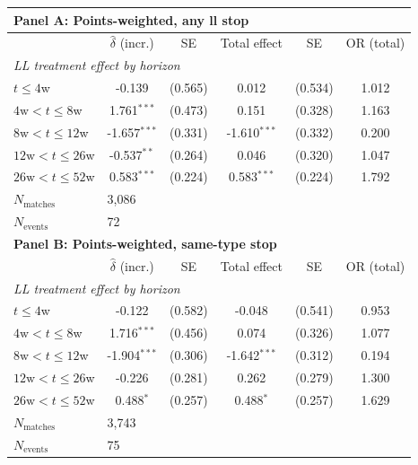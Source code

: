 \begin{tabular}{lccccc}
\toprule
\multicolumn{6}{l}{\textbf{Panel A: Points-weighted, any ll stop}} \\
\midrule
 & $\hat{\delta}$ (incr.) & SE & Total effect & SE & OR (total) \\
\midrule
\multicolumn{6}{l}{\textit{LL treatment effect by horizon}} \\
$t \leq 4$w & -0.139 & (0.565) & 0.012 & (0.534) & 1.012 \\
$4\text{w} < t \leq 8$w & 1.761$^{***}$ & (0.473) & 0.151 & (0.328) & 1.163 \\
$8\text{w} < t \leq 12$w & -1.657$^{***}$ & (0.331) & -1.610$^{***}$ & (0.332) & 0.200 \\
$12\text{w} < t \leq 26$w & -0.537$^{**}$ & (0.264) & 0.046 & (0.320) & 1.047 \\
$26\text{w} < t \leq 52$w & 0.583$^{***}$ & (0.224) & 0.583$^{***}$ & (0.224) & 1.792 \\
[4pt]
$N_{\text{matches}}$ & \multicolumn{5}{l}{3,086} \\
$N_{\text{events}}$ & \multicolumn{5}{l}{72} \\
\midrule
\multicolumn{6}{l}{\textbf{Panel B: Points-weighted, same-type stop}} \\
\midrule
 & $\hat{\delta}$ (incr.) & SE & Total effect & SE & OR (total) \\
\midrule
\multicolumn{6}{l}{\textit{LL treatment effect by horizon}} \\
$t \leq 4$w & -0.122 & (0.582) & -0.048 & (0.541) & 0.953 \\
$4\text{w} < t \leq 8$w & 1.716$^{***}$ & (0.456) & 0.074 & (0.326) & 1.077 \\
$8\text{w} < t \leq 12$w & -1.904$^{***}$ & (0.306) & -1.642$^{***}$ & (0.312) & 0.194 \\
$12\text{w} < t \leq 26$w & -0.226 & (0.281) & 0.262 & (0.279) & 1.300 \\
$26\text{w} < t \leq 52$w & 0.488$^{*}$ & (0.257) & 0.488$^{*}$ & (0.257) & 1.629 \\
[4pt]
$N_{\text{matches}}$ & \multicolumn{5}{l}{3,743} \\
$N_{\text{events}}$ & \multicolumn{5}{l}{75} \\
\bottomrule
\end{tabular}
